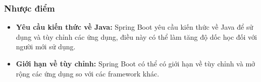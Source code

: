 \subsubsection{Nhược điểm}
\begin{itemize}
  \item \textbf{Yêu cầu kiến thức về Java:} Spring Boot yêu cầu kiến thức về Java để sử dụng và tùy chỉnh các ứng dụng, điều này có thể làm tăng độ dốc học đối với người mới sử dụng.
  \item \textbf{Giới hạn về tùy chỉnh:} Spring Boot có thể có giới hạn về tùy chỉnh và mở rộng các ứng dụng so với các framework khác.
\end{itemize}